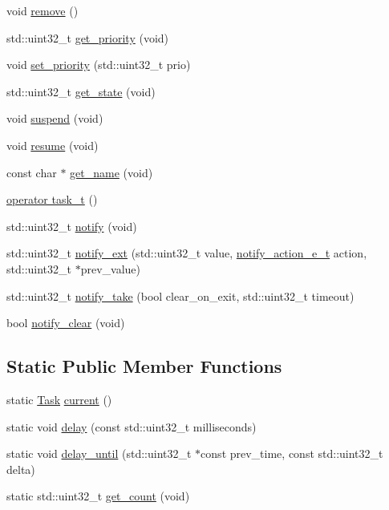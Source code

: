 \begin{DoxyCompactItemize}
\item 
void \hyperlink{classpros_1_1Task_a45269807dfc87bb1d5e9580346793e9d}{remove} ()
\item 
std\+::uint32\+\_\+t \hyperlink{classpros_1_1Task_a97e11478bd99181a664ed6e975fdb248}{get\+\_\+priority} (void)
\item 
void \hyperlink{classpros_1_1Task_a205a9937d34311ba10f540bc58d0b0b9}{set\+\_\+priority} (std\+::uint32\+\_\+t prio)
\item 
std\+::uint32\+\_\+t \hyperlink{classpros_1_1Task_a45f0b63eec57e7fe8adf3876988588bf}{get\+\_\+state} (void)
\item 
void \hyperlink{classpros_1_1Task_a89005762dcd3026c953ae5eedd7ecd97}{suspend} (void)
\item 
void \hyperlink{classpros_1_1Task_ada2c08d04b39f11582cea90b59b8f317}{resume} (void)
\item 
const char $\ast$ \hyperlink{classpros_1_1Task_a3c559d11cf602b99fc870b8be43fe191}{get\+\_\+name} (void)
\item 
\hyperlink{classpros_1_1Task_a16c15efcec74a76b6848fc999ff0c232}{operator task\+\_\+t} ()
\item 
std\+::uint32\+\_\+t \hyperlink{classpros_1_1Task_ad376e3065701ba4853d4be1c90c0544c}{notify} (void)
\item 
std\+::uint32\+\_\+t \hyperlink{classpros_1_1Task_add5bc6272aaa903fdf8ae6656d8ffddb}{notify\+\_\+ext} (std\+::uint32\+\_\+t value, \hyperlink{rtos_8h_a42ea99b5e5d38da0b98154609cf6c570}{notify\+\_\+action\+\_\+e\+\_\+t} action, std\+::uint32\+\_\+t $\ast$prev\+\_\+value)
\item 
std\+::uint32\+\_\+t \hyperlink{classpros_1_1Task_ab0424664979128a156fbcd2533a75da2}{notify\+\_\+take} (bool clear\+\_\+on\+\_\+exit, std\+::uint32\+\_\+t timeout)
\item 
bool \hyperlink{classpros_1_1Task_a6fc6c97f2dd9fc92b6b9ff47557f215f}{notify\+\_\+clear} (void)
\end{DoxyCompactItemize}
\subsection*{Static Public Member Functions}
\begin{DoxyCompactItemize}
\item 
static \hyperlink{classpros_1_1Task}{Task} \hyperlink{classpros_1_1Task_a510ca3e67e54aa4293438d73148a1d6b}{current} ()
\item 
static void \hyperlink{classpros_1_1Task_a4341b580544831eea11b840cf068587b}{delay} (const std\+::uint32\+\_\+t milliseconds)
\item 
static void \hyperlink{classpros_1_1Task_aa038d0eeb973ce7fca8689fa5bb91fec}{delay\+\_\+until} (std\+::uint32\+\_\+t $\ast$const prev\+\_\+time, const std\+::uint32\+\_\+t delta)
\item 
static std\+::uint32\+\_\+t \hyperlink{classpros_1_1Task_a9b1eda960abda807cb8447075fc4ea44}{get\+\_\+count} (void)
\end{DoxyCompactItemize}


